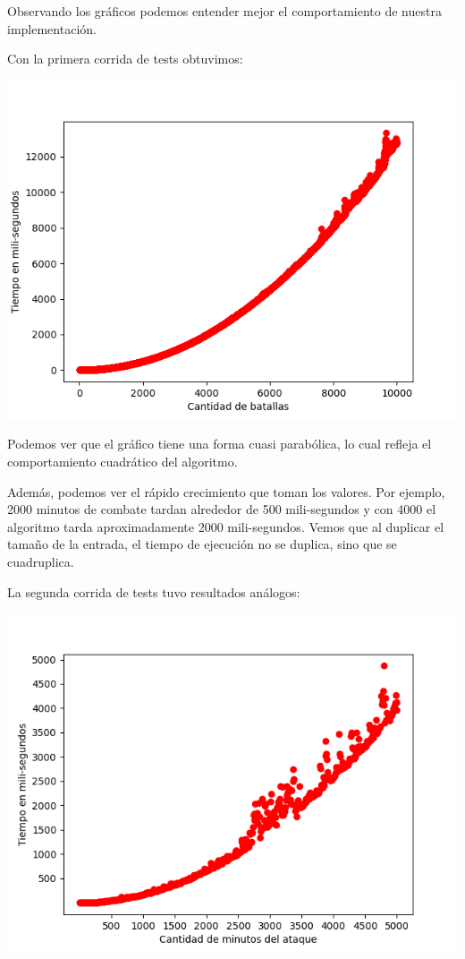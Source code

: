 \documentclass{article}
\begin{document}
Observando los gráficos podemos entender mejor el comportamiento de nuestra implementación. 

Con la primera corrida de tests obtuvimos:

\includegraphics[scale=0.69]{graficoComplejidadVintage.png}

Podemos ver que el gráfico tiene una forma cuasi parabólica, lo cual refleja el comportamiento cuadrático del algoritmo.

Además, podemos ver el rápido crecimiento que toman los valores. Por ejemplo, 2000 minutos de combate tardan alrededor de 500 mili-segundos y con 4000 el algoritmo tarda aproximadamente 2000 mili-segundos. Vemos que al duplicar el tamaño de la entrada, el tiempo de ejecución no se duplica, sino que se cuadruplica.

La segunda corrida de tests tuvo resultados análogos:

\includegraphics[scale=0.69]{graficoComplejidad.png}
\end{document}
